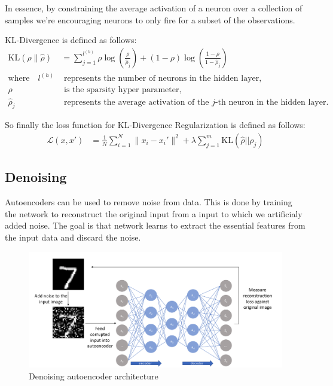 \documentclass{article}
\begin{document}
		In essence, by constraining the average activation of a neuron over a collection of samples we're encouraging neurons to only fire for a subset of the observations.
		
		KL-Divergence is defined as follows:
		\begin{align}
			\text{KL}(\rho \| \hat{\rho}) &= \sum_{j=1}^{l^{(h)}} \rho \log\left(\frac{\rho}{\hat{\rho}_j}\right) + (1 - \rho) \log\left(\frac{1 - \rho}{1 - \hat{\rho}_j}\right) \\
			\text{where} \quad l^{(h)} &\text{ represents the number of neurons in the hidden layer,} \nonumber \\
			\rho &\text{ is the sparsity hyper parameter,} \nonumber \\
			\hat{\rho}_j &\text{ represents the average activation of the } j\text{-th neuron in the hidden layer.} \nonumber
		\end{align}
		

		So finally the loss function for KL-Divergence Regularization is defined as follows:
		\begin{align}
			\mathcal{L}(x, x') &= \frac{1}{N} \sum_{i=1}^{N} \|x_i - x_i'\|^2 + \lambda \sum_{j=1}^{m} \text{KL}(\hat{\rho} || \rho_j)
		\end{align}
		


	\subsection{Denoising}
		Autoencoders can be used to remove noise from data. This is done by training the network to reconstruct the original input from a input to which we artificialy added noise. 
		The goal is that network learns to extract the essential features from the input data and discard the noise. 

		\begin{figure}[H]
			\centering
			\includegraphics[width=0.8\linewidth]{images/denosing-autoencoder.png}
			\caption{Denoising autoencoder architecture}
			\label{fig:denoising}
		\end{figure}
\end{document}
